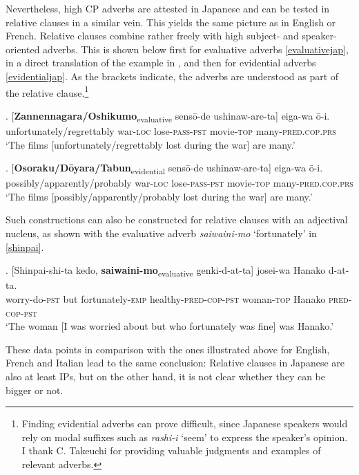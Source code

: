 Nevertheless, high CP adverbs are attested in Japanese and can be tested in relative clauses in a similar vein. This yields the same picture as in  English or  French. Relative clauses combine rather freely with high subject- and speaker-oriented adverbs. This is shown below first for evaluative adverbs \ref{evaluativejap}, in a direct translation of the example in \citet[214]{cinque:2020:relcl}, and then for evidential adverbs \ref{evidentialjap}. As the brackets indicate, the adverbs are understood as part of the relative clause.\footnote{Finding evidential adverbs can prove difficult, since Japanese speakers would rely on modal suffixes such as \textit{rashi-i} `seem' to express the speaker's opinion. I thank C. Takeuchi for providing valuable judgments and examples of relevant adverbs.}

\exg. [\textbf{Zannennagara/Oshikumo}\textsubscript{evaluative} sensō-de ushinaw-are-ta] eiga-wa ō-i.\\
unfortunately/regrettably war-\textsc{loc} lose-\textsc{pass-pst} movie-\textsc{top} many-\textsc{pred.cop.prs}\\
`The films [unfortunately/regrettably lost during the war] are many.’ \label{evaluativejap}

\exg. [\textbf{Osoraku/Dōyara/Tabun}\textsubscript{evidential} sensō-de ushinaw-are-ta] eiga-wa ō-i.\\
possibly/apparently/probably war-\textsc{loc} lose-\textsc{pass-pst} movie-\textsc{top} many-\textsc{pred.cop.prs}\\
`The films [possibly/apparently/probably lost during the war] are many.’ \label{evidentialjap}

Such constructions can also be constructed for relative clauses with an adjectival nucleus, as shown with the evaluative adverb \textit{saiwaini-mo} `fortunately’ in \ref{shinpai}.

\exg. [Shinpai-shi-ta kedo, \textbf{saiwaini-mo}\textsubscript{evaluative} genki-d-at-ta] josei-wa Hanako d-at-ta.\\
worry-do-\textsc{pst} but fortunately-\textsc{emp} healthy-\textsc{pred-cop-pst} woman-\textsc{top} Hanako \textsc{pred-cop-pst}\\
`The woman [I was worried about but who fortunately was fine] was Hanako.’ \label{shinpai}

These data points in comparison with the ones illustrated above for  English,  French and  Italian lead to the same conclusion: Relative clauses in Japanese are also at least IPs, but on the other hand, it is not clear whether they can be bigger or not.

